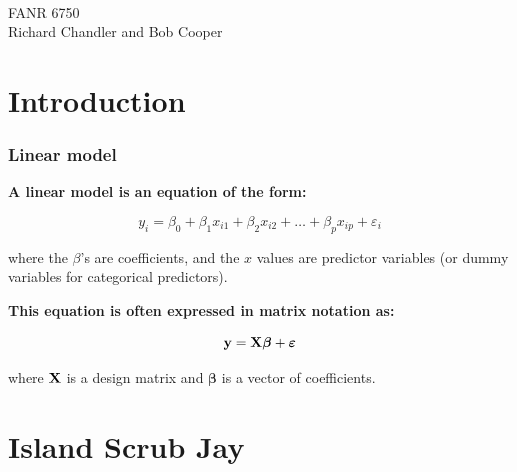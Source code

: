 \documentclass[color=usenames,dvipsnames]{beamer}\usepackage[]{graphicx}\usepackage[]{color}
\begin{document}
\begin{frame}[plain]
  \huge
  \centering \par
  {\color{RoyalBlue}{Lab 12 -- Linear Models}} \\
  \vfill
  \LARGE
  FANR 6750 \\
  \vfill
  Richard Chandler and Bob Cooper
\end{frame}






\section{Introduction}




\begin{frame}
  \frametitle{Linear model}
{\bf A linear model is an equation of the form:}

\[
y_i = \beta_0 + \beta_1 x_{i1} + \beta_2 x_{i2} + \ldots + \beta_p
x_{ip} + \varepsilon_i
\]

where the $\beta$'s are coefficients, and the $x$ values are predictor
variables (or dummy variables for categorical predictors).

\vspace{0.5cm}

{\bf This equation is often expressed in matrix notation as:}

\[
{\bf y} = {\bf X} {\bm{\beta}} + {\bm \varepsilon}
\]

where $\bf X$ is a \alert{design matrix} and $\bm{\beta}$ is a
vector of coefficients.
\end{frame}







\section{Island Scrub Jay}
\end{document}
